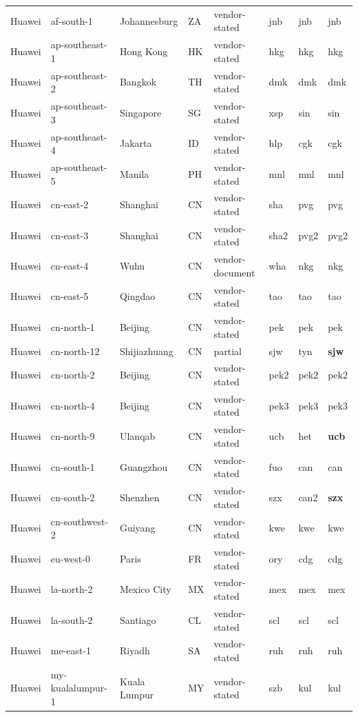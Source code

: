 \begin{longtable}{llllllll}
Huawei & af-south-1 & Johannesburg & ZA & vendor-stated & jnb & jnb & jnb \\
Huawei & ap-southeast-1 & Hong Kong & HK & vendor-stated & hkg & hkg & hkg \\
Huawei & ap-southeast-2 & Bangkok & TH & vendor-stated & dmk & dmk & dmk \\
Huawei & ap-southeast-3 & Singapore & SG & vendor-stated & xsp & sin & sin \\
Huawei & ap-southeast-4 & Jakarta & ID & vendor-stated & hlp & cgk & cgk \\
Huawei & ap-southeast-5 & Manila & PH & vendor-stated & mnl & mnl & mnl \\
Huawei & cn-east-2 & Shanghai & CN & vendor-stated & sha & pvg & pvg \\
Huawei & cn-east-3 & Shanghai & CN & vendor-stated & sha2 & pvg2 & pvg2 \\
Huawei & cn-east-4 & Wuhu & CN & vendor-document & wha & nkg & nkg \\
Huawei & cn-east-5 & Qingdao & CN & vendor-stated & tao & tao & tao \\
Huawei & cn-north-1 & Beijing & CN & vendor-stated & pek & pek & pek \\
Huawei & cn-north-12 & Shijiazhuang & CN & partial & sjw & tyn & \textbf{sjw} \\
Huawei & cn-north-2 & Beijing & CN & vendor-stated & pek2 & pek2 & pek2 \\
Huawei & cn-north-4 & Beijing & CN & vendor-stated & pek3 & pek3 & pek3 \\
Huawei & cn-north-9 & Ulanqab & CN & vendor-stated & ucb & het & \textbf{ucb} \\
Huawei & cn-south-1 & Guangzhou & CN & vendor-stated & fuo & can & can \\
Huawei & cn-south-2 & Shenzhen & CN & vendor-stated & szx & can2 & \textbf{szx} \\
Huawei & cn-southwest-2 & Guiyang & CN & vendor-stated & kwe & kwe & kwe \\
Huawei & eu-west-0 & Paris & FR & vendor-stated & ory & cdg & cdg \\
Huawei & la-north-2 & Mexico City & MX & vendor-stated & mex & mex & mex \\
Huawei & la-south-2 & Santiago & CL & vendor-stated & scl & scl & scl \\
Huawei & me-east-1 & Riyadh & SA & vendor-stated & ruh & ruh & ruh \\
Huawei & my-kualalumpur-1 & Kuala Lumpur & MY & vendor-stated & szb & kul & kul \\

\end{longtable}
